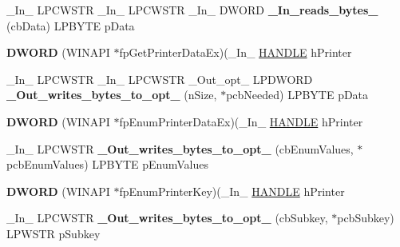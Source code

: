 \begin{DoxyCompactItemize}
\item 
\mbox{\label{struct___p_r_i_n_t_p_r_o_v_i_d_o_r_a44b8e0b559f573887ab68bb8dd47b911}} 
\+\_\+\+In\+\_\+ L\+P\+C\+W\+S\+TR \+\_\+\+In\+\_\+ L\+P\+C\+W\+S\+TR \+\_\+\+In\+\_\+ D\+W\+O\+RD {\bfseries \+\_\+\+In\+\_\+reads\+\_\+bytes\+\_\+} (cb\+Data) L\+P\+B\+Y\+TE p\+Data
\item 
\mbox{\label{struct___p_r_i_n_t_p_r_o_v_i_d_o_r_a599d5b173561625939623055a3166702}} 
{\bfseries D\+W\+O\+RD} (W\+I\+N\+A\+PI $\ast$fp\+Get\+Printer\+Data\+Ex)(\+\_\+\+In\+\_\+ \hyperlink{interfacevoid}{H\+A\+N\+D\+LE} h\+Printer
\item 
\mbox{\label{struct___p_r_i_n_t_p_r_o_v_i_d_o_r_ae2a15ac5de66baade53d8994de715207}} 
\+\_\+\+In\+\_\+ L\+P\+C\+W\+S\+TR \+\_\+\+In\+\_\+ L\+P\+C\+W\+S\+TR \+\_\+\+Out\+\_\+opt\+\_\+ L\+P\+D\+W\+O\+RD {\bfseries \+\_\+\+Out\+\_\+writes\+\_\+bytes\+\_\+to\+\_\+opt\+\_\+} (n\+Size, $\ast$pcb\+Needed) L\+P\+B\+Y\+TE p\+Data
\item 
\mbox{\label{struct___p_r_i_n_t_p_r_o_v_i_d_o_r_a702a37f04081d65a6dea6e1ea4576d7e}} 
{\bfseries D\+W\+O\+RD} (W\+I\+N\+A\+PI $\ast$fp\+Enum\+Printer\+Data\+Ex)(\+\_\+\+In\+\_\+ \hyperlink{interfacevoid}{H\+A\+N\+D\+LE} h\+Printer
\item 
\mbox{\label{struct___p_r_i_n_t_p_r_o_v_i_d_o_r_a1468207b4e3ced4fc023f23816c22ba9}} 
\+\_\+\+In\+\_\+ L\+P\+C\+W\+S\+TR {\bfseries \+\_\+\+Out\+\_\+writes\+\_\+bytes\+\_\+to\+\_\+opt\+\_\+} (cb\+Enum\+Values, $\ast$pcb\+Enum\+Values) L\+P\+B\+Y\+TE p\+Enum\+Values
\item 
\mbox{\label{struct___p_r_i_n_t_p_r_o_v_i_d_o_r_a4e85bead4f412110f936da5a885bfb4d}} 
{\bfseries D\+W\+O\+RD} (W\+I\+N\+A\+PI $\ast$fp\+Enum\+Printer\+Key)(\+\_\+\+In\+\_\+ \hyperlink{interfacevoid}{H\+A\+N\+D\+LE} h\+Printer
\item 
\mbox{\label{struct___p_r_i_n_t_p_r_o_v_i_d_o_r_aa46dd756284bda87d87d13836fb0aeba}} 
\+\_\+\+In\+\_\+ L\+P\+C\+W\+S\+TR {\bfseries \+\_\+\+Out\+\_\+writes\+\_\+bytes\+\_\+to\+\_\+opt\+\_\+} (cb\+Subkey, $\ast$pcb\+Subkey) L\+P\+W\+S\+TR p\+Subkey

\end{DoxyCompactItemize}
